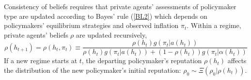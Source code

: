 \documentclass[12pt,letter,leqno]{article}
\theoremstyle{asn}
\theoremstyle{lem}
\theoremstyle{slem}
\theoremstyle{prop}
\theoremstyle{appprop}
\theoremstyle{rem}
\theoremstyle{defn}
\begin{document}
Consistency of beliefs requires that private agents' assessments of policymaker type are updated 
according to Bayes' rule (\ref{BL2}) which depends on policymakers' equilibrium strategies and observed inflation $\pi_t$. Within a regime, private agents' beliefs $\rho $ are updated recursively,%
\begin{equation}
\rho \left( h_{t+1}\right) =\rho \left( h_{t},\pi _{t}\right) \equiv \frac{\rho
\left( h_{t}\right) g(\pi _{t}|a\left( h_{t}\right) )}{\rho \left(
h_{t}\right) g(\pi _{t}|a\left( h_{t}\right) )+(1-\rho \left( h_{t}\right)
)g(\pi _{t}|\alpha \left( h_{t}\right) )}  \label{BL2}
\end{equation}%
If a new regime starts at $t$, the departing policymaker's reputation $\rho(h_t)$ affects the distribution of the new policymaker's initial reputation: $\rho_0 \sim \Xi(\rho_0|\rho(h_{t}))$. 
\end{document}
